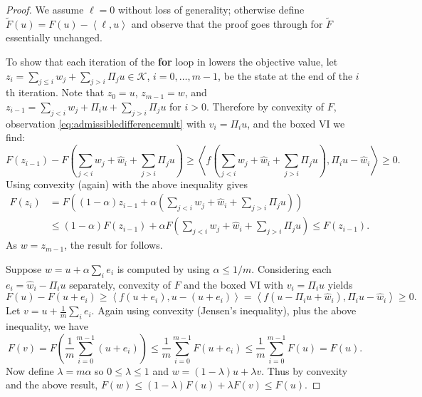 \documentclass[letterpaper,final,12pt,reqno]{amsart}
\theoremstyle{cstyle}
\theoremstyle{cstyle*}
\theoremstyle{dstyle}
\numberwithin{equation}{section}
\numberwithin{figure}{section}
\numberwithin{table}{section}
\numberwithin{theorem}{section}
\newcommand{\cK}{\mathcal{K}}
\newcommand{\ip}[2]{\left<#1,#2\right>}
\begin{document}
\begin{proof}  We assume $\ell=0$ without loss of generality; otherwise define $\tilde F(u)=F(u) - \ip{\ell}{u}$ and observe that the proof goes through for $\tilde F$ essentially unchanged.

To show that each iteration of the \textbf{for} loop in  lowers the objective value, let $z_{i} = \sum_{j\le i} w_j + \sum_{j > i} \Pi_j u \in \cK$, $i=0,\dots,m-1$, be the state at the end of the $i$th iteration.  Note that $z_0=u$, $z_{m-1}=w$, and $z_{i-1} = \sum_{j < i} w_j + \Pi_i u + \sum_{j > i} \Pi_j u$ for $i>0$.  Therefore by convexity of $F$, observation \eqref{eq:admissibledifferencemult} with $v_i=\Pi_i u$, and the boxed VI we find:
\begin{equation*}
F(z_{i-1}) - F\left(\sum_{j<i} w_j + \hat w_i + \sum_{j > i} \Pi_j u\right) \ge \ip{f\left(\sum_{j<i} w_j + \hat w_i + \sum_{j > i} \Pi_j u\right)}{\Pi_i u - \hat w_i} \ge 0.
\end{equation*}
Using convexity (again) with the above inequality gives
\begin{align*}
F(z_i) &= F\left((1-\alpha) z_{i-1} + \alpha \left(\sum_{j<i} w_j + \hat w_i + \sum_{j > i} \Pi_j u\right)\right) \\
&\le  (1-\alpha) F(z_{i-1}) + \alpha F\left(\sum_{j<i} w_j + \hat w_i + \sum_{j > i} \Pi_j u\right) \le F(z_{i-1}).
\end{align*}
As $w = z_{m-1}$, the result for  follows.

Suppose $w=u+\alpha\sum_i e_i$ is computed by  using $\alpha \le 1/m$.  Considering each $e_i=\hat w_i - \Pi_i u$ separately, convexity of $F$ and the boxed VI with $v_i=\Pi_i u$ yields
\begin{equation}
F(u) - F(u+e_i) \ge \ip{f(u+e_i)}{u-(u+e_i)} = \ip{f(u-\Pi_i u + \hat w_i)}{\Pi_i u - \hat w_i} \ge 0. \label{eq:cdaddonereduction}
\end{equation}
Let $v = u+ \frac{1}{m} \sum_i e_i$.  Again using convexity (Jensen's inequality), plus the above inequality, we have
\begin{equation*}
F(v) = F\left(\frac{1}{m} \sum_{i=0}^{m-1} (u+e_i)\right) \le \frac{1}{m} \sum_{i=0}^{m-1} F(u+e_i) \le \frac{1}{m} \sum_{i=0}^{m-1} F(u) = F(u).
\end{equation*}
Now define $\lambda = m\alpha$ so $0 \le \lambda \le 1$ and $w = (1-\lambda) u + \lambda v$.  Thus by convexity and the above result, $F(w) \le (1-\lambda) F(u) + \lambda F(v) \le F(u)$.
\end{proof}
\end{document}
